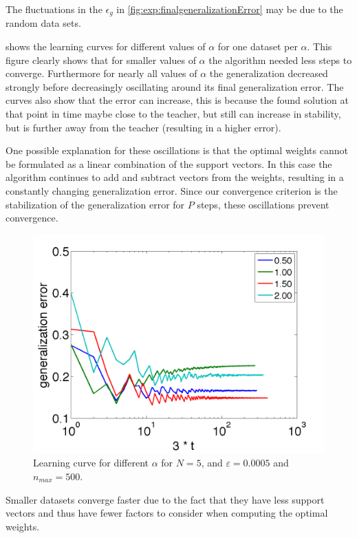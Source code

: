 The fluctuations in the $\epsilon_g$ in \cref{fig:exp:finalgeneralizationError} may be due to the random data sets. 

 shows the learning curves for different values of $\alpha$ for one dataset per $\alpha$. This figure clearly shows that for smaller values of $\alpha$ the algorithm needed less steps to converge. Furthermore for nearly all values of $\alpha$ the generalization decreased strongly before decreasingly oscillating around its final generalization error. The curves also show that the error can increase, this is because the found solution at that point in time maybe close to the teacher, but still can increase in stability, but is further away from the teacher (resulting in a higher error). 

One possible explanation for these oscillations is that the optimal weights cannot be formulated as a linear combination of the support vectors. In this case the algorithm continues to add and subtract vectors from the weights, resulting in a constantly changing generalization error. Since our convergence criterion is the stabilization of the generalization error for $P$ steps, these oscillations prevent convergence. 

\begin{figure}
	\centering
	\includegraphics[width=0.9\columnwidth]{./img/N5NMAX500error3}
	\caption{Learning curve for different $\alpha$ for $N = 5$, and $\varepsilon = 0.0005$ and $n_{max} = 500$.}
	\label{fig:exp:learningcurve}
\end{figure}

Smaller datasets converge faster due to the fact that they have less support vectors and thus have fewer factors to consider when computing the optimal weights. 